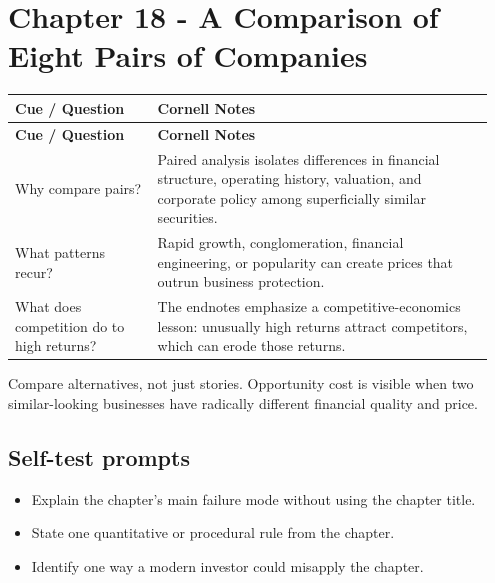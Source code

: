 \documentclass[11pt]{article}
\begin{document}
\section{Chapter 18 - A Comparison of Eight Pairs of Companies}
\begin{longtable}{@{}>{\raggedright\arraybackslash}p{0.29\linewidth}>{\raggedright\arraybackslash}p{0.66\linewidth}@{}}\toprule\textbf{Cue / Question} & \textbf{Cornell Notes}\\\midrule\endfirsthead\toprule\textbf{Cue / Question} & \textbf{Cornell Notes}\\\midrule\endhead
Why compare pairs? & Paired analysis isolates differences in financial structure, operating history, valuation, and corporate policy among superficially similar securities. \\
What patterns recur? & Rapid growth, conglomeration, financial engineering, or popularity can create prices that outrun business protection. \\
What does competition do to high returns? & The endnotes emphasize a competitive-economics lesson: unusually high returns attract competitors, which can erode those returns. \\
\bottomrule\end{longtable}
\begin{principlebox}Compare alternatives, not just stories. Opportunity cost is visible when two similar-looking businesses have radically different financial quality and price.\end{principlebox}
\subsection*{Self-test prompts}\begin{itemize}\item Explain the chapter's main failure mode without using the chapter title.\item State one quantitative or procedural rule from the chapter.\item Identify one way a modern investor could misapply the chapter.\end{itemize}
\end{document}
